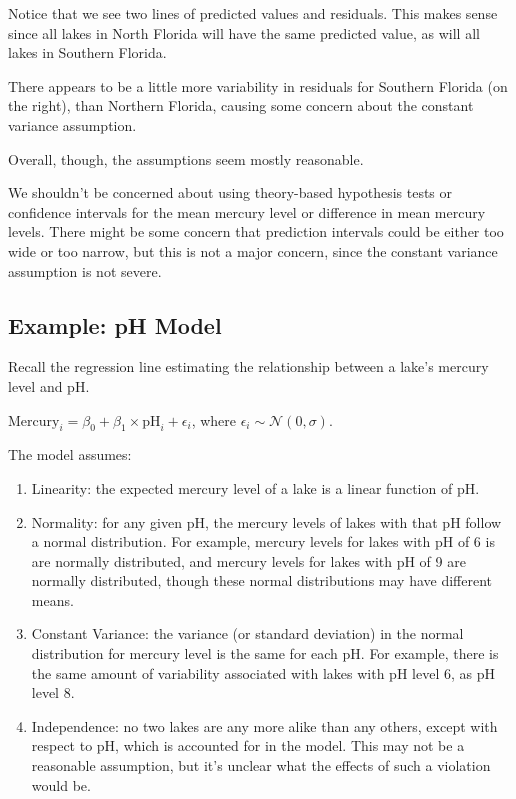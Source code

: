 \documentclass[
  letterpaper,
  DIV=11,
  numbers=noendperiod]{scrreprt}
\begin{document}
Notice that we see two lines of predicted values and residuals. This
makes sense since all lakes in North Florida will have the same
predicted value, as will all lakes in Southern Florida.

There appears to be a little more variability in residuals for Southern
Florida (on the right), than Northern Florida, causing some concern
about the constant variance assumption.

Overall, though, the assumptions seem mostly reasonable.

We shouldn't be concerned about using theory-based hypothesis tests or
confidence intervals for the mean mercury level or difference in mean
mercury levels. There might be some concern that prediction intervals
could be either too wide or too narrow, but this is not a major concern,
since the constant variance assumption is not severe.

\subsection{Example: pH Model}\label{example-ph-model}

Recall the regression line estimating the relationship between a lake's
mercury level and pH.

\(\text{Mercury}_i = \beta_0 + \beta_1\times\text{pH}_i + \epsilon_i\),
where \(\epsilon_i\sim\mathcal{N}(0, \sigma)\).

The model assumes:

\begin{enumerate}
\def\labelenumi{\arabic{enumi}.}
\item
  Linearity: the expected mercury level of a lake is a linear function
  of pH.
\item
  Normality: for any given pH, the mercury levels of lakes with that pH
  follow a normal distribution. For example, mercury levels for lakes
  with pH of 6 is are normally distributed, and mercury levels for lakes
  with pH of 9 are normally distributed, though these normal
  distributions may have different means.
\item
  Constant Variance: the variance (or standard deviation) in the normal
  distribution for mercury level is the same for each pH. For example,
  there is the same amount of variability associated with lakes with pH
  level 6, as pH level 8.
\item
  Independence: no two lakes are any more alike than any others, except
  with respect to pH, which is accounted for in the model. This may not
  be a reasonable assumption, but it's unclear what the effects of such
  a violation would be.
\end{enumerate}
\end{document}
